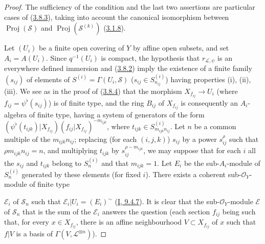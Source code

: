 \begin{proof}
The sufficiency of the condition and the last two assertions are
particular cases of (\hyperref[II.3.8.3]{3.8.3}), taking into account the
canonical isomorphism between $\operatorname{Proj}(\mathcal{S})$ and
$\operatorname{Proj}(\mathcal{S}^{(k)})$
(\hyperref[II.3.1.8]{3.1.8}).

Let $(U_i)$ be a finite open covering of $Y$ by affine open subsets, and
set $A_i=A(U_i)$. Since $q^{-1}(U_i)$ is compact, the hypothesis that
$r_{\mathcal{L},\psi}$ is an everywhere defined immersion and
(\hyperref[II.3.8.2]{3.8.2}) imply the existence of a finite family
$(s_{ij})$ of elements of
$S^{(i)}=\Gamma(U_i,\mathcal{S})$ ($s_{ij}\in S_{n_{ij}}^{(i)}$) having
properties (i), (ii), (iii). We see as in the proof of
(\hyperref[II.3.8.4]{3.8.4}) that the morphism $X_{f_{ij}}\to U_i$ (where
$f_{ij}=\psi^\flat(s_{ij})$) is of finite type, and the ring $B_{ij}$ of
$X_{f_{ij}}$ is consequently an $A_i$-algebra of finite type, having a system
of generators of the form
$(\psi^\flat(t_{ijk})|X_{f_{ij}})(f_{ij}|X_{f_{ij}})^{-m_{ijk}}$, where
$t_{ijk}\in S_{m_{ijk}n_{ij}}^{(i)}$. Let $n$ be a common multiple of the
$m_{ijk}n_{ij}$; replacing (for each $(i,j,k)$) $s_{ij}$ by a
power $s_{ij}^\rho$ such that $\rho m_{ijk}n_{ij}=n$, and multiplying
$t_{ijk}$ by $s_{ij}^{\rho-m_{ijk}}$, we may suppose that for each $i$
all the $s_{ij}$ and $t_{ijk}$ belong to $S_n^{(i)}$ and that
$m_{ijk}=1$. Let $E_i$ be the sub-$A_i$-module of $S_n^{(i)}$ generated by these
elements (for fixed $i$). There exists a coherent sub-$\mathcal{O}_Y$-module of
finite type


$\mathcal{E}_i$ of $\mathcal{S}_n$ such that
$\mathcal{E}_i|U_i=(E_i)^{\sim}$
(\hyperref[I.9.4.7]{I, 9.4.7}). It is clear that the
sub-$\mathcal{O}_Y$-module $\mathcal{E}$ of $\mathcal{S}_n$ that is the sum of
the $\mathcal{E}_i$ answers the question (each section $f_{ij}$ being such
that, for every $x\in X_{f_{ij}}$, there is an affine neighbourhood
$V\subset X_{f_{ij}}$ of $x$ such that $f|V$ is a basis of
$\Gamma(V,\mathcal{L}^{\otimes n})$).
\end{proof}

